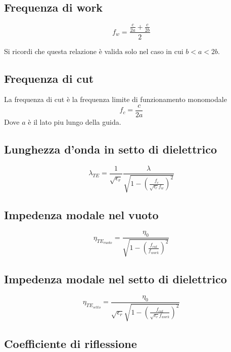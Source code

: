 \documentclass[10pt,a4paper]{report}
\begin{document}
		\subsection{Frequenza di work}

				\begin{equation}
				f_w=\frac{\frac{c}{2a}+\frac{c}{2b}}{2}
				\end{equation}

				Si ricordi che questa relazione è valida solo nel caso in cui $b<a<2b$.

		\subsection{Frequenza di cut}
	
				La frequenza di cut è la frequenza limite di funzionamento monomodale
				\begin{equation}
				f_c=\frac{c}{2a}
				\end{equation}
				Dove $a$ è il lato piu lungo della guida.

		\subsection{Lunghezza d'onda in setto di dielettrico}

			\begin{equation}
			\lambda_{TE}=\frac{1}{\sqrt{\epsilon_r}}\frac{\lambda}{\sqrt{1- (\frac{f_c}{\sqrt{\epsilon_r}f_w})^2}}
			\end{equation}

		\subsection{Impedenza modale nel vuoto}

				\begin{equation}
				\eta_{TE_{vuoto}}=\frac{\eta_0}{ \sqrt{ 1- ( \frac {f_{cut}} {f_{work}} )^2 } }
				\end{equation}
		\subsection{Impedenza modale nel setto di dielettrico}

				\begin{equation}
				\eta_{TE_{setto}}=\frac{\eta_0}{\sqrt{\epsilon_r} \sqrt{ 1- ( \frac {f_{cut}} {\sqrt{\epsilon_r} f_{work}} )^2 } }
				\end{equation}

		\subsection{Coefficiente di riflessione}
\end{document}
